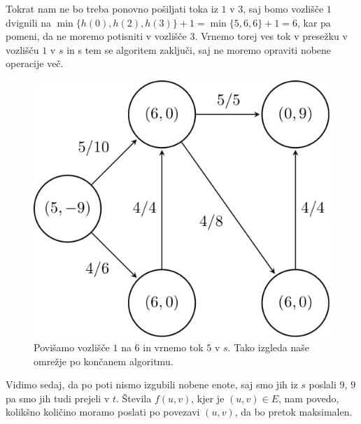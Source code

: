 \documentclass[mat1]{fmfdelo}
\begin{document}
Tokrat nam ne bo treba ponovno pošiljati toka iz $1$ v $3$, saj bomo vozlišče $1$ dvignili na $\min\{h(0), h(2), h(3)\} +1 = \min\{5,6,6\}+1 = 6$, kar
pa pomeni, da ne moremo potisniti v vozlišče $3$. Vrnemo torej ves tok v presežku v vozlišču $1$ v $s$ in s tem se algoritem zaključi, saj ne moremo
opraviti nobene operacije več.

\begin{figure}[H]
  \centering
  \includegraphics[scale=.358]{images/graf2-16/graf2-16-1.jpg}
  \caption{Povišamo vozlišče $1$ na $6$ in vrnemo tok $5$ v $s$. Tako izgleda naše omrežje po končanem algoritmu.}
\end{figure}

Vidimo sedaj, da po poti nismo izgubili nobene enote, saj smo jih iz $s$ poslali $9$, $9$ pa smo jih tudi prejeli v $t$. Števila $f(u,v)$, kjer je $(u,v) \in E$,
nam povedo, kolikšno količino moramo poslati po povezavi $(u,v)$, da bo pretok maksimalen.

\end{document}
